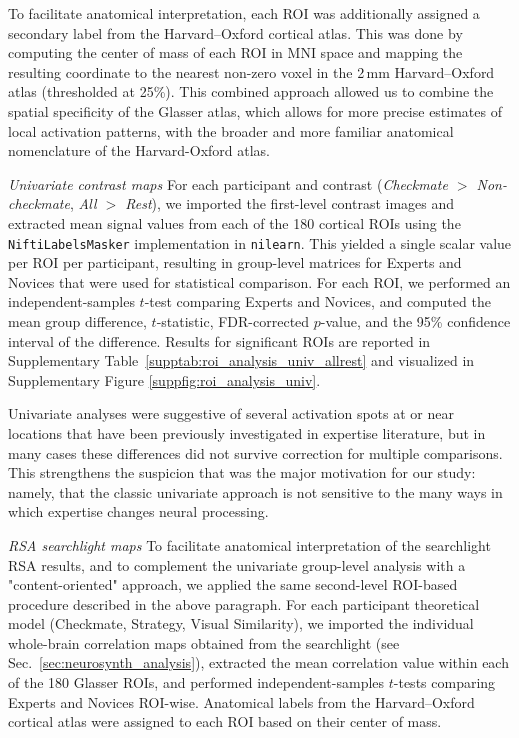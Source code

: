 To facilitate anatomical interpretation, each ROI was additionally assigned a secondary label from the Harvard–Oxford cortical atlas. This was done by computing the center of mass of each ROI in MNI space and mapping the resulting coordinate to the nearest non-zero voxel in the 2\,mm Harvard–Oxford atlas (thresholded at 25\%). This combined approach allowed us to combine the spatial specificity of the Glasser atlas, which allows for more precise estimates of local activation patterns, with the broader and more familiar anatomical nomenclature of the Harvard-Oxford atlas.

\emph{Univariate contrast maps}
For each participant and contrast (\emph{Checkmate $>$ Non-checkmate}, \emph{All $>$ Rest}), we imported the first-level contrast images and extracted mean signal values from each of the 180 cortical ROIs using the \texttt{NiftiLabelsMasker} implementation in \texttt{nilearn}. This yielded a single scalar value per ROI per participant, resulting in group-level matrices for Experts and Novices that were used for statistical comparison. For each ROI, we performed an independent-samples $t$-test comparing Experts and Novices, and computed the mean group difference, $t$-statistic, FDR-corrected $p$-value, and the 95\% confidence interval of the difference. Results for significant ROIs are reported in Supplementary Table~\ref{supptab:roi_analysis_univ_allrest} and visualized in Supplementary Figure \ref{suppfig:roi_analysis_univ}.

Univariate analyses were suggestive of several activation spots at or near locations that have been previously investigated in expertise literature, but in many cases these differences did not survive correction for multiple comparisons. This strengthens the suspicion that was the major motivation for our study: namely, that the classic univariate approach is not sensitive to the many ways in which expertise changes neural processing.

\emph{RSA searchlight maps}
To facilitate anatomical interpretation of the searchlight RSA results, and to complement the univariate group-level analysis with a "content-oriented" approach, we applied the same second-level ROI-based procedure described in the above paragraph. For each participant theoretical model (Checkmate, Strategy, Visual Similarity), we imported the individual whole-brain correlation maps obtained from the searchlight (see Sec.~\ref{sec:neurosynth_analysis}), extracted the mean correlation value within each of the 180 Glasser ROIs, and performed independent-samples $t$-tests comparing Experts and Novices ROI-wise. Anatomical labels from the Harvard–Oxford cortical atlas were assigned to each ROI based on their center of mass.

